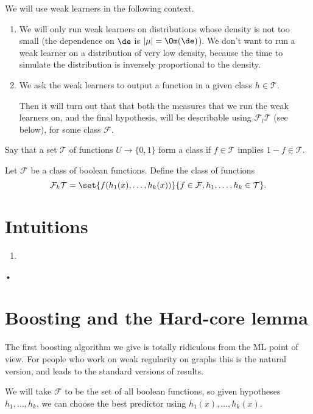 We will use weak learners in the following context. 
\begin{enumerate}
\item
We will only run weak learners on distributions whose density is not too small (the dependence on $\de$ is $|\mu|=\Om(\de)$). We don't want to run a weak learner on a distribution of very low density, because the time to simulate  the distribution is inversely proportional to the density.
\item
We ask the weak learners to output a function in a given class $h\in \mathcal T$. 

Then it will turn out that that both the measures that we run the weak learners on, and the final hypothesis, will be describable using $\mathcal F_l \mathcal T$ (see below), for some class $\mathcal F$.
\end{enumerate}

\begin{df}
Say that a set $\mathcal T$ of functions $U\to \{0,1\}$ form a class if $f\in \mathcal T$ implies $1-f \in \mathcal T$. 

Let $\mathcal F$ be a class of boolean functions. Define the class of functions
$$
\mathcal F_k \mathcal T = \set{f(h_1(x),\ldots, h_k(x))}{f\in\mathcal F, h_1,\ldots, h_k\in \mathcal T}.
$$
\end{df}

\section{Intuitions}

\begin{enumerate}
\item

\end{enumerate}•

\section{Boosting and the Hard-core lemma}


The first boosting algorithm we give is totally ridiculous from the ML point of view. For people who work on weak regularity on graphs this is the natural version, and leads to the standard versions of results.

We will take $\mathcal F$ to be the set of all boolean functions, so given hypotheses $h_1,\ldots, h_k$, we can choose the best predictor using $h_1(x),\ldots, h_k(x)$.

